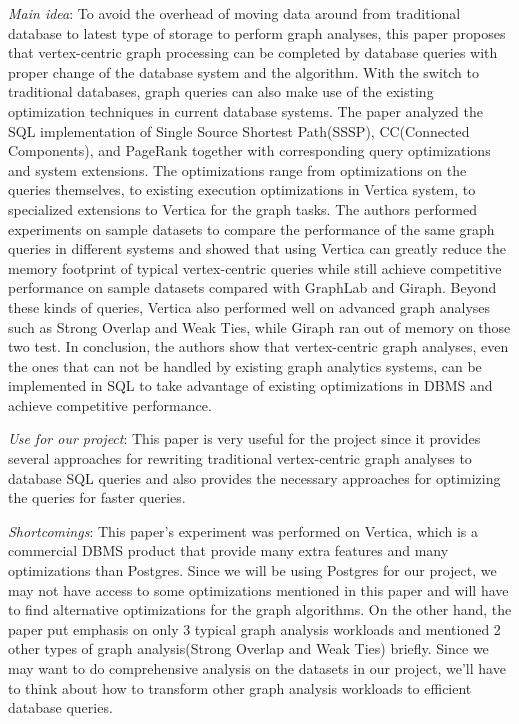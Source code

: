 \begin{itemize*}
\item {\em Main idea}: To avoid the overhead of moving data around from traditional database to latest type of storage to perform graph analyses, this paper proposes that vertex-centric graph processing can be completed by database queries with proper change of the database system and the algorithm. With the switch to traditional databases, graph queries can also make use of the existing optimization techniques in current database systems. The paper analyzed the SQL implementation of Single Source Shortest Path(SSSP), CC(Connected Components), and PageRank together with corresponding query optimizations and system extensions. The optimizations range from optimizations on the queries themselves, to existing execution optimizations in Vertica system, to specialized extensions to Vertica for the graph tasks. The authors performed experiments on sample datasets to compare the performance of the same graph queries in different systems and showed that using Vertica can greatly reduce the memory footprint of typical vertex-centric queries while still achieve competitive performance on sample datasets compared with GraphLab and Giraph. Beyond these kinds of queries, Vertica also performed well on advanced graph analyses such as Strong Overlap and Weak Ties, while Giraph ran out of memory on those two test. In conclusion, the authors show that vertex-centric graph analyses, even the ones that can not be handled by existing graph analytics systems, can be implemented in SQL to take advantage of existing optimizations in DBMS and achieve competitive performance.
\item {\em Use for our project}:
      This paper is very useful for the project since it provides several approaches for rewriting traditional vertex-centric graph analyses to database SQL queries and also provides the necessary approaches for optimizing the queries for faster queries. 
\item {\em Shortcomings}:
      This paper’s experiment was performed on Vertica, which is a commercial DBMS product that provide many extra features and many optimizations than Postgres. Since we will be using Postgres for our project, we may not have access to some optimizations mentioned in this paper and will have to find alternative optimizations for the graph algorithms. On the other hand, the paper put emphasis on only 3 typical graph analysis workloads and mentioned 2 other types of graph analysis(Strong Overlap and Weak Ties) briefly. Since we may want to do comprehensive analysis on the datasets in our project, we’ll have to think about how to transform other graph analysis workloads to efficient database queries.
\end{itemize*}

